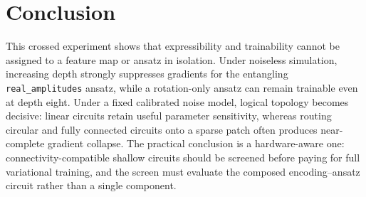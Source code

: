 \documentclass[conference]{IEEEtran}
\begin{document}
\section{Conclusion}

This crossed experiment shows that expressibility and trainability cannot be
assigned to a feature map or ansatz in isolation.  Under noiseless
simulation, increasing depth strongly suppresses gradients for the
entangling \texttt{real\_amplitudes} ansatz, while a rotation-only ansatz can
remain trainable even at depth eight.  Under a fixed calibrated noise model,
logical topology becomes decisive: linear circuits retain useful parameter
sensitivity, whereas routing circular and fully connected circuits onto a
sparse patch often produces near-complete gradient collapse.  The practical
conclusion is a hardware-aware one: connectivity-compatible shallow circuits
should be screened before paying for full variational training, and the
screen must evaluate the composed encoding--ansatz circuit rather than a
single component.



\end{document}
